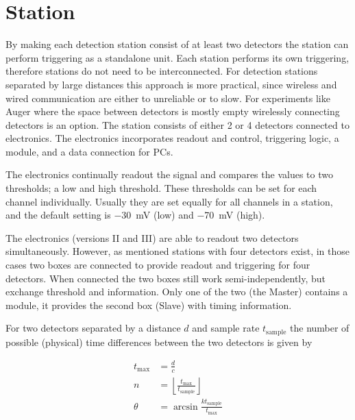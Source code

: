 \section{Station}

By making each detection station consist of at least two detectors the station can perform triggering as a standalone unit. Each station performs its own triggering, therefore stations do not need to be interconnected. For detection stations separated by large distances this approach is more practical, since wireless and wired communication are either to unreliable or to slow. For experiments like Auger where the space between detectors is mostly empty wirelessly connecting detectors is an option. The \hisparc station consists of either 2 or 4 detectors connected to \hisparc electronics. The \hisparc electronics incorporates \pmt readout and control, triggering logic, a \gps module, and a data connection for PCs.

The \hisparc electronics continually readout the \pmt signal and compares the \adc values to two thresholds; a low and high threshold. These thresholds can be set for each channel individually. Usually they are set equally for all channels in a station, and the default setting is \SI{-30}{\milli\volt} (low) and \SI{-70}{\milli\volt} (high).

The \hisparc electronics (versions II and III) are able to readout two detectors simultaneously. However, as mentioned stations with four detectors exist, in those cases two boxes are connected to provide readout and triggering for four detectors. When connected the two boxes still work semi-independently, but exchange threshold and \gps information. Only one of the two (the Master) contains a \gps module, it provides the second box (Slave) with \gps timing information.

For two detectors separated by a distance $d$ and sample rate $t_{\mathrm{sample}}$ the number of possible (physical) time differences between the two detectors is given by

\begin{equation}
    \begin{split}
        t_{\mathrm{max}} &= \frac{d}{c} \\
        n &= \left\lfloor \frac{t_{\mathrm{max}}}{t_{\mathrm{sample}}} \right\rfloor \\
        \theta &= \arcsin \frac{k t_{\mathrm{sample}}}{t_{\mathrm{max}}} \\
    \end{split}
\end{equation}




